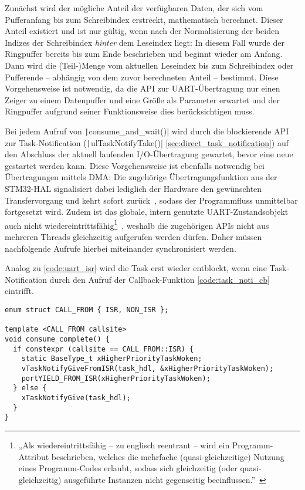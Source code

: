 Zunächst wird der mögliche Anteil der verfügbaren Daten, der sich vom
Pufferanfang bis zum Schreibindex erstreckt, mathematisch berechnet. Dieser
Anteil existiert und ist nur gültig, wenn nach der Normalisierung der beiden
Indizes der Schreibindex \textit{hinter} dem Leseindex liegt: In diesem Fall
wurde der Ringpuffer bereits bis zum Ende beschrieben und beginnt wieder am
Anfang. Dann wird die (Teil-)Menge vom aktuellen Leseindex bis zum Schreibindex
oder Pufferende -- abhängig von dem zuvor berechneten Anteil -- bestimmt. Diese
Vorgehensweise ist notwendig, da die API zur UART-Übertragung nur einen Zeiger
zu einem Datenpuffer und eine Größe als Parameter erwartet und der Ringpuffer
aufgrund seiner Funktionsweise dies berücksichtigen muss.

Bei jedem Aufruf von \texttt|consume_and_wait()| wird durch die
blockierende API zur Task-Notification (\texttt|ulTaskNotifyTake()|
\ref{sec:direct_task_notification}) auf den Abschluss der aktuell laufenden
I/O-Übertragung gewartet, bevor eine neue gestartet werden kann. Diese
Vorgehensweise ist ebenfalls notwendig bei Übertragungen mittels DMA: Die
zugehörige Übertragungsfunktion aus der STM32-HAL signalisiert dabei lediglich
der Hardware den gewünschten Transfervorgang und kehrt sofort
zurück~\cite{HAL_UART_Transmit_DMA}, sodass der Programmfluss unmittelbar
fortgesetzt wird. Zudem ist das globale, intern genutzte UART-Zustandsobjekt
auch nicht wiedereintrittsfähig\footnote{„Als wiedereintrittsfähig -- zu
englisch reentrant -- wird ein Programm-Attribut beschrieben, welches die
mehrfache (quasi-gleichzeitige) Nutzung eines Programm-Codes erlaubt, sodass
sich gleichzeitig (oder quasi-gleichzeitig) ausgeführte Instanzen nicht
gegenseitig
beeinflussen.”~\cite{wiedereintrittsfaehigkeit}}~\cite{stm32_hal_reentrancy},
weshalb die zugehörigen APIs nicht aus mehreren Threads gleichzeitig aufgerufen
werden dürfen. Daher müssen nachfolgende Aufrufe hierbei miteinander
synchronisiert werden.

Analog zu \ref{code:uart_isr} wird die Task erst wieder entblockt, wenn eine
Task-Notification durch den Aufruf der Callback-Funktion \ref{code:task_noti_cb}
eintrifft.

\begin{code}
\begin{verbatim}
enum struct CALL_FROM { ISR, NON_ISR };

template <CALL_FROM callsite>
void consume_complete() {
  if constexpr (callsite == CALL_FROM::ISR) {
    static BaseType_t xHigherPriorityTaskWoken;
    vTaskNotifyGiveFromISR(task_hdl, &xHigherPriorityTaskWoken);
    portYIELD_FROM_ISR(xHigherPriorityTaskWoken);
  } else {
    xTaskNotifyGive(task_hdl);
  }
}
\end{verbatim}
    \label{code:task_noti_cb}
\end{code}

